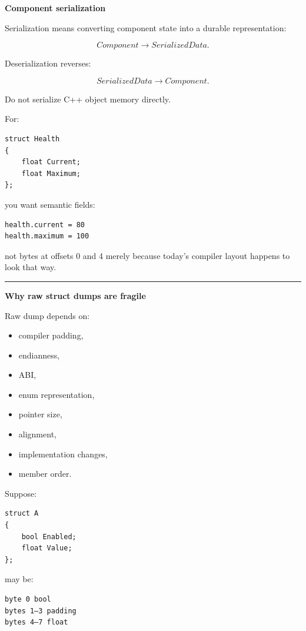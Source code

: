 \textbf{Component serialization}

Serialization means converting component state into a durable representation:

\[
Component
\rightarrow
SerializedData.
\]

Deserialization reverses:

\[
SerializedData
\rightarrow
Component.
\]

Do not serialize C++ object memory directly.

For:

\begin{verbatim}
struct Health
{
    float Current;
    float Maximum;
};
\end{verbatim}

you want semantic fields:

\begin{verbatim}
health.current = 80
health.maximum = 100
\end{verbatim}

not bytes at offsets 0 and 4 merely because today's compiler layout happens to look that way.

\begin{center}\rule{0.5\linewidth}{0.5pt}\end{center}

\textbf{Why raw struct dumps are fragile}

Raw dump depends on:

\begin{itemize}
\tightlist
\item
  compiler padding,
\item
  endianness,
\item
  ABI,
\item
  enum representation,
\item
  pointer size,
\item
  alignment,
\item
  implementation changes,
\item
  member order.
\end{itemize}

Suppose:

\begin{verbatim}
struct A
{
    bool Enabled;
    float Value;
};
\end{verbatim}

may be:

\begin{verbatim}
byte 0 bool
bytes 1–3 padding
bytes 4–7 float
\end{verbatim}

